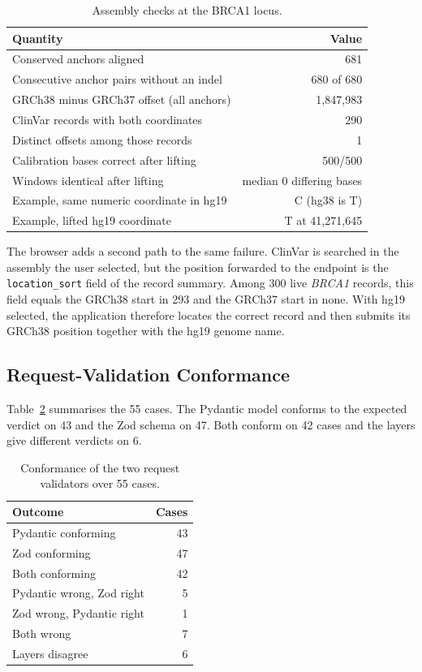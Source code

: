 \documentclass[10pt,journal,a4paper]{IEEEtran}
\begin{document}
\begin{table}[!t]
\caption{Assembly checks at the BRCA1 locus.}
\label{tab:assembly}
\centering
\footnotesize
\begin{tabular}{@{}lr@{}}
\toprule
Quantity & Value \\
\midrule
Conserved anchors aligned & 681 \\
Consecutive anchor pairs without an indel & 680 of 680 \\
GRCh38 minus GRCh37 offset (all anchors) & 1{,}847{,}983 \\
ClinVar records with both coordinates & 290 \\
Distinct offsets among those records & 1 \\
Calibration bases correct after lifting & 500/500 \\
Windows identical after lifting & median 0 differing bases \\
Example, same numeric coordinate in hg19 & C (hg38 is T) \\
Example, lifted hg19 coordinate & T at 41{,}271{,}645 \\
\bottomrule
\end{tabular}
\end{table}

The browser adds a second path to the same failure. ClinVar is searched in the assembly the user selected, but the position forwarded to the endpoint is the \texttt{location\_sort} field of the record summary. Among 300 live \emph{BRCA1} records, this field equals the GRCh38 start in 293 and the GRCh37 start in none. With hg19 selected, the application therefore locates the correct record and then submits its GRCh38 position together with the hg19 genome name.

\subsection{Request-Validation Conformance}
\label{sec:res-validation}
Table~\ref{tab:validation} summarises the 55 cases. The Pydantic model conforms to the expected verdict on 43 and the Zod schema on 47. Both conform on 42 cases and the layers give different verdicts on 6.

\begin{table}[!t]
\caption{Conformance of the two request validators over 55 cases.}
\label{tab:validation}
\centering
\footnotesize
\begin{tabular}{@{}lr@{}}
\toprule
Outcome & Cases \\
\midrule
Pydantic conforming & 43 \\
Zod conforming & 47 \\
Both conforming & 42 \\
Pydantic wrong, Zod right & 5 \\
Zod wrong, Pydantic right & 1 \\
Both wrong & 7 \\
\midrule
Layers disagree & 6 \\
\bottomrule
\end{tabular}
\end{table}
\end{document}

